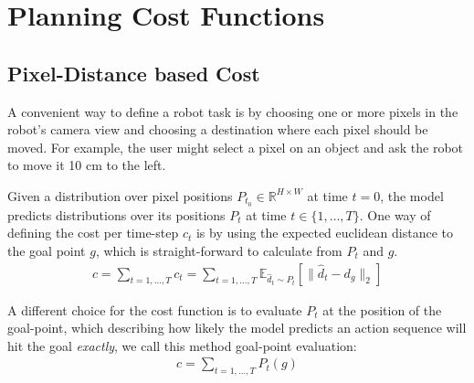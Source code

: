 \section{Planning Cost Functions}


\subsection{Pixel-Distance based Cost}
A convenient way to define a robot task is by choosing one or more pixels in the robot's camera view and choosing a destination where each pixel should be moved. For example, the user might select a pixel on an object and ask the robot to move it 10 cm to the left.

 
 Given a distribution over pixel positions $P_{t_0}\in\mathbb{R}^{H\times W}$ at time $t = 0$, the model predicts distributions over its positions $P_t$ at time $t \in \{ 1, \dots, T \}$. One way of defining the cost per time-step $c_t$ is by using the expected euclidean distance to the goal point $g$, which is straight-forward to calculate from $P_t$ and $g$. 
 \begin{align}
c = \sum_{t = 1, \dots, T} c_t =  \sum_{t = 1, \dots, T} \mathbb{E}_{\hat{d}_{t} \sim P_{t}} \left[\|\hat{d}_{t} - d_{g}\|_2\right] 
 \label{eq:cost}
 \end{align}
 
 A different choice for the cost function is to evaluate $P_{t}$ at the position of the goal-point, which describing how likely the model predicts an action sequence will hit the goal \emph{exactly}, we call this method goal-point evaluation:
 \begin{align}
 c = \sum_{t = 1, \dots, T} P_t(g)
 \label{eq:goal_point_eval}
 \end{align}
 

